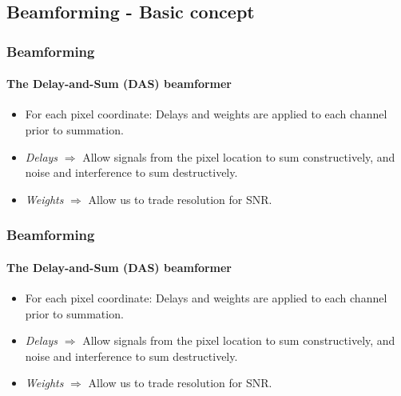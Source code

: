 \documentclass[
    beamer                                       %
 , xelatex                                      %
]{common/mytemplate}
\begin{document}
\subsection{Beamforming - Basic concept}
\begin{frame}
\frametitle{Beamforming}
\framesubtitle{The Delay-and-Sum (DAS) beamformer}
\vspace{5pt}
\begin{figure}[H]
\begin{narrow}{-0.5cm}{-0.5cm}
\end{narrow}
\end{figure}
\vspace{-10pt}
\begin{itemize}
\item For each pixel coordinate: Delays and weights are applied to each channel prior to summation.
\item \emph{Delays} $\Rightarrow$ Allow signals from the pixel location to sum constructively, and noise and interference to sum destructively.
\item \emph{Weights} $\Rightarrow$ Allow us to trade resolution for SNR. 
\end{itemize}
\end{frame}


\begin{frame}
\frametitle{Beamforming}
\framesubtitle{The Delay-and-Sum (DAS) beamformer}
\vspace{5pt}
\begin{figure}[H]
\begin{narrow}{-0.5cm}{-0.5cm}
\end{narrow}
\end{figure}
\vspace{-10pt}
\begin{itemize}
\item For each pixel coordinate: Delays and weights are applied to each channel prior to summation.
\item \emph{Delays} $\Rightarrow$ Allow signals from the pixel location to sum constructively, and noise and interference to sum destructively.
\item \emph{Weights} $\Rightarrow$ Allow us to trade resolution for SNR. 
\end{itemize}
\end{frame}
\end{document}
